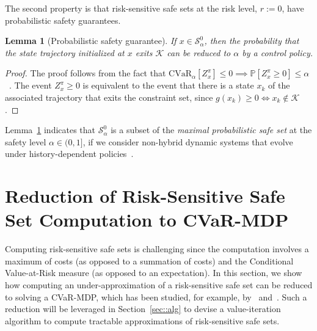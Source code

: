 \documentclass[letterpaper, 10 pt, conference]{ieeeconf}  %
\newtheorem{lemma}{Lemma}
\begin{document}
The second property is that risk-sensitive safe sets at the risk level, $r := 0$, have probabilistic safety guarantees.
\begin{lemma}[Probabilistic safety guarantee]\label{mylemma1}
If $x \in \mathcal{S}_\alpha^0$, then the probability that the state trajectory initialized at $x$ exits $\mathcal{K}$ can be reduced to $\alpha$ by a control policy.
\end{lemma}
\begin{proof}
The proof follows from the fact that $\text{CVaR}_\alpha[Z_x^\pi] \leq 0 \implies \mathbb{P}[Z_x^\pi\geq 0] \leq \alpha$ 
~\cite[Sec. 6.2.4, pp. 257-258]{shapiro2009lectures}.
%
%
The event $Z_x^\pi\geq 0$ is equivalent to the event that there is a state $x_k$ of the associated trajectory
that exits the constraint set, since $g(x_k) \geq 0 \iff x_k \notin \mathcal{K}$.
%
%
\end{proof}
Lemma~\ref{mylemma1} indicates that $\mathcal{S}_\alpha^0$ is a subset of the \textit{maximal probabilistic safe set} 
at the safety level $\alpha \in (0, 1]$, 
if we consider non-hybrid dynamic systems that evolve under history-dependent policies~\cite[Eqs. 9 and 11]{abate2008probabilistic}.
%
%
\section{Reduction of Risk-Sensitive Safe Set Computation to CVaR-MDP}\label{sec::reduction}
%
Computing risk-sensitive safe sets is challenging since the computation involves a maximum of costs (as opposed to a summation of costs)
and the Conditional Value-at-Risk measure (as opposed to an expectation). 
In this section, we show how computing an under-approximation of a risk-sensitive safe set can be reduced to solving a CVaR-MDP,
which has been studied, for example, by~\cite{chow2015risk} and~\cite{haskell2015convex}. 
Such a reduction will be leveraged in Section~\ref{sec::alg} to devise a value-iteration algorithm to compute tractable approximations of risk-sensitive safe sets.
\end{document}
